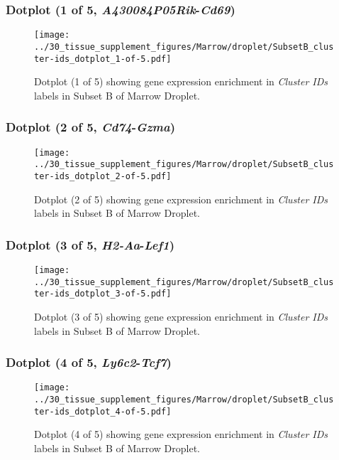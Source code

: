 \clearpage

\subsubsection{Dotplot (1 of 5, \emph{A430084P05Rik}-\emph{Cd69})}
\begin{figure}[h]
\centering
\texttt{[image: ../30\_tissue\_supplement\_figures/Marrow/droplet/SubsetB\_cluster-ids\_dotplot\_1-of-5.pdf]}

\caption{ Dotplot (1 of 5)  showing gene expression enrichment in \emph{Cluster IDs} labels in Subset B of Marrow Droplet. }
\end{figure}


\clearpage

\subsubsection{Dotplot (2 of 5, \emph{Cd74}-\emph{Gzma})}
\begin{figure}[h]
\centering
\texttt{[image: ../30\_tissue\_supplement\_figures/Marrow/droplet/SubsetB\_cluster-ids\_dotplot\_2-of-5.pdf]}

\caption{ Dotplot (2 of 5)  showing gene expression enrichment in \emph{Cluster IDs} labels in Subset B of Marrow Droplet. }
\end{figure}


\clearpage

\subsubsection{Dotplot (3 of 5, \emph{H2-Aa}-\emph{Lef1})}
\begin{figure}[h]
\centering
\texttt{[image: ../30\_tissue\_supplement\_figures/Marrow/droplet/SubsetB\_cluster-ids\_dotplot\_3-of-5.pdf]}

\caption{ Dotplot (3 of 5)  showing gene expression enrichment in \emph{Cluster IDs} labels in Subset B of Marrow Droplet. }
\end{figure}


\clearpage

\subsubsection{Dotplot (4 of 5, \emph{Ly6c2}-\emph{Tcf7})}
\begin{figure}[h]
\centering
\texttt{[image: ../30\_tissue\_supplement\_figures/Marrow/droplet/SubsetB\_cluster-ids\_dotplot\_4-of-5.pdf]}

\caption{ Dotplot (4 of 5)  showing gene expression enrichment in \emph{Cluster IDs} labels in Subset B of Marrow Droplet. }
\end{figure}


